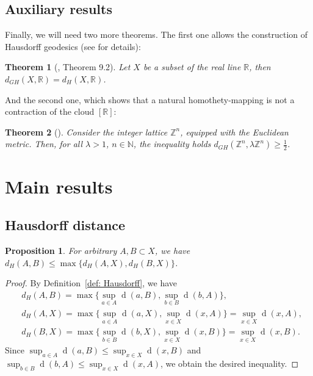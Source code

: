 \documentclass{article}
\newtheorem{proposition}{Proposition}[]
\newtheorem{theorem}{Theorem}[]
\theoremstyle{definition}
\theoremstyle{plain}
\newcommand{\dist}{\operatorname{d}}
\renewcommand{\:}{\colon}
\newcommand{\0}{\emptyset}
\renewcommand{\(}{\rom(}
\renewcommand{\)}{\rom)}
\renewcommand{\ss}{\subset}
\newcommand{\N}{\mathbb{N}}
\newcommand{\R}{\mathbb{R}}
\newcommand{\Z}{\mathbb{Z}}
\begin{document}
\subsection{Auxiliary results}

Finally, we will need two more theorems. The first one allows the construction of Hausdorff geodesics (see \cite{metrictreesRUS} for details):

\begin{theorem}[\cite{metrictreesRUS}, Theorem 9.2]\label{thm:HausdEqGromovHausdR}
Let $X$ be a subset of the real line $\R$, then $d_{GH}(X,\R)=d_H(X,\R)$.
\end{theorem}

And the second one, which shows that a natural homothety-mapping is not a contraction of the cloud $[\R]$:

\begin{theorem}[\cite{nglitghclitcotrl}]\label{thm: homothety-fails}
Consider the integer lattice $\Z^n$, equipped with the Euclidean metric. Then, for all $\lambda > 1$, $n\in\N$, the inequality holds $d_{GH}(\Z^n, \lambda \Z^n)\ge \frac{1}{2}$.   
\end{theorem}

\section{Main results}

\subsection{Hausdorff distance}

\begin{proposition}\label{thm: UltraNetsHausdorff}
For arbitrary $A, B\ss X$, we have $d_H(A, B)\le \max\big\{d_H(A, X), d_H(B, X)\big\}$.
\end{proposition}

\begin{proof}
By Definition~\ref{def: Hausdorff}, we have
\begin{align*}
    &d_H(A, B) = \max\big\{\sup_{a\in A}\dist(a, B), \sup_{b\in B}\dist(b,A)\big\},\\
    &d_H(A, X) = \max\big\{\sup_{a\in A}\dist(a, X), \sup_{x\in X}\dist(x, A)\big\} = \sup_{x\in X}\dist(x, A),\\
    &d_H(B, X) = \max\big\{\sup_{b\in B}\dist(b,X), \sup_{x\in X}\dist(x, B)\big\} = \sup_{x\in X}\dist(x, B).
\end{align*}
Since $\sup_{a\in A}\dist(a, B)\le \sup_{x\in X}\dist(x, B)$ and $\sup_{b\in B}\dist(b, A)\le \sup_{x\in X}\dist(x, A)$, we obtain the desired inequality.
\end{proof}
\end{document}
